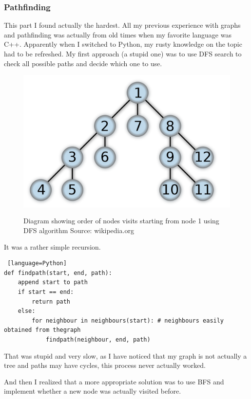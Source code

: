 \documentclass[11pt,a4paper]{report}
\newenvironment{img}{
	\begin{center}
		\begin{figure}[H]
			\begin{center}
			
}{
	\end{center}
		\end{figure}
			\end{center}
}
\begin{document}
				\subsubsection{Pathfinding}
					This part I found actually the hardest. All my previous experience with graphs and pathfinding was actually from old times when my favorite language was C++. Apparently when I switched to Python, my rusty knowledge on the topic had to be refreshed. My first approach (a stupid one) was to use DFS search to check all possible paths and decide which one to use.
					\begin{img}
						\includegraphics[width=350pt]{images/dfs-diagram}\\
						\caption{Diagram showing order of nodes visits starting from node 1 using DFS algorithm Source: wikipedia.org}
						\label{DFSalg}
					\end{img}
					It was a rather simple recursion.
					\begin{lstlisting} [language=Python]
def findpath(start, end, path):
	append start to path
	if start == end:
		return path
	else:
		for neighbour in neighbours(start): # neighbours easily obtained from thegraph
			findpath(neighbour, end, path)
					\end{lstlisting}
					That was stupid and very slow, as I have noticed that my graph is not actually a tree and paths may have cycles, this process never actually worked.
					
					And then I realized that a more appropriate solution was to use BFS and implement whether a new node was actually visited before.
					
\end{document}
